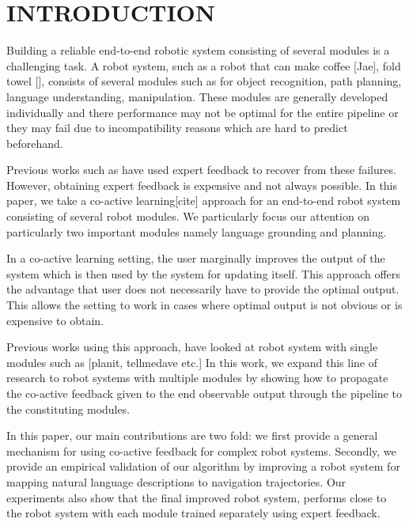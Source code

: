 \section{INTRODUCTION}
Building a reliable end-to-end robotic system consisting of several modules is a challenging task.
A robot system, such as a robot that can make coffee [Jae], fold towel [], consists of several
modules such as for object recognition, path planning, language understanding, manipulation. These modules
are generally developed individually and there performance may not be optimal for the entire pipeline or they may fail due to incompatibility reasons which are hard to predict beforehand.

Previous works such as \cite{abbeel2010autonomous} have used expert feedback to recover from these failures. However, obtaining expert feedback is expensive and not always possible. In this paper, we take a co-active learning[cite] approach for an end-to-end robot system consisting of several robot modules. We particularly focus our attention on particularly two important modules namely language grounding and planning.

In a co-active learning setting, the user marginally improves the output of the system which is then used by the system for updating itself. This approach offers the advantage that user does not necessarily have to provide the optimal output. This allows the setting to work in cases where optimal output is not obvious or is expensive to obtain. 

Previous works using this approach, have looked at robot system with single modules such as [planit, tellmedave etc.] 
In this work, we expand this line of research to robot systems with multiple modules by showing how to propagate the co-active feedback given to the end observable output through the pipeline to the constituting modules.


In this paper, our main contributions are two fold: we first provide a general mechanism
for using co-active feedback for complex robot systems. Secondly, we provide an empirical validation of 
our algorithm by improving a robot system for mapping natural language descriptions to navigation  trajectories. Our experiments also show that the final improved robot system, performs close to the robot system with each module trained separately using expert feedback.

